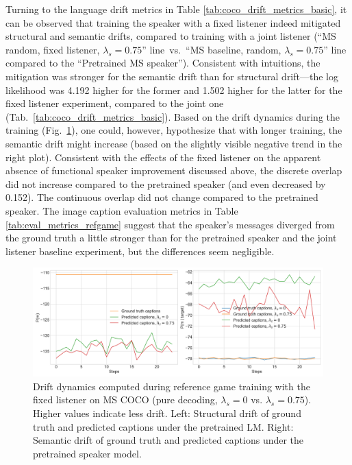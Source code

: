 Turning to the language drift metrics in Table \ref{tab:coco_drift_metrics_basic}, it can be observed that training the speaker with a fixed listener indeed mitigated structural and semantic drifts, compared to training with a joint listener (``MS random, fixed listener, $\lambda_s=0.75$'' line~vs.~``MS baseline, random, $\lambda_s=0.75$'' line compared to the ``Pretrained MS speaker''). Consistent with intuitions, the mitigation was stronger for the semantic drift than for structural drift---the log likelihood was 4.192 higher for the former and 1.502 higher for the latter for the fixed listener experiment, compared to the joint one (Tab.~\ref{tab:coco_drift_metrics_basic}). Based on the drift dynamics during the training (Fig.~\ref{fig:coco_fixed_listener_075_str_sem_drift}), one could, however, hypothesize that with longer training, the semantic drift might increase (based on the slightly visible negative trend in the right plot). Consistent with the effects of the fixed listener on the apparent absence of functional speaker improvement discussed above, the discrete overlap did not increase compared to the pretrained speaker (and even decreased by 0.152). The continuous overlap did not change compared to the pretrained speaker. The image caption evaluation metrics in Table \ref{tab:eval_metrics_refgame} suggest that the speaker's messages diverged from the ground truth a little stronger than for the pretrained speaker and the joint listener baseline experiment, but the differences seem negligible.
\begin{figure}
	\centering
	\includegraphics[width=\linewidth]{images/coco_fixedListener_structural_semantic_drift_4000_pure_0_075_random.png}
	\caption{Drift dynamics computed during reference game training with the fixed listener on MS COCO (pure decoding, $\lambda_s=0$ vs. $\lambda_s=0.75$). Higher values indicate less drift. Left: Structural drift of ground truth and predicted captions under the pretrained LM. Right: Semantic drift of ground truth and predicted captions under the pretrained speaker model.}
	\label{fig:coco_fixed_listener_075_str_sem_drift}
\end{figure}

